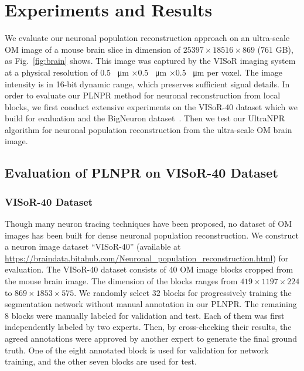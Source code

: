 \section{Experiments and Results}
\label{sec:experiments}

We evaluate our neuronal population reconstruction approach on an ultra-scale OM image of a mouse brain slice in dimension of $25397\times 18516\times 869$ ($761$ GB), as Fig.~\ref{fig:brain} shows.
%
This image was captured by the VISoR imaging system~\cite{Wang2019} at a physical resolution of $0.5$ \SI{}{\micro\metre} $\times0.5$ \SI{}{\micro\metre} $\times 0.5$ \SI{}{\micro\metre} per voxel. 
%
The image intensity is in 16-bit dynamic range, which preserves sufficient signal details.
In order to evaluate our PLNPR method for neuronal reconstruction from local blocks, we first conduct extensive experiments on the VISoR-40 dataset which we build for evaluation and the BigNeuron dataset~\cite{peng2015}. 
%
Then we test our UltraNPR algorithm for neuronal population reconstruction from the ultra-scale OM brain image.

\subsection{Evaluation of PLNPR on VISoR-40 Dataset}
\label{sec:exp_PLNPR_VISoR}

\subsubsection{VISoR-40 Dataset}
Though many neuron tracing techniques have been proposed, no dataset of OM images has been built for dense neuronal population reconstruction.
We construct a neuron image dataset ``VISoR-40'' (available at \url{https://braindata.bitahub.com/Neuronal_population_reconstruction.html}) for evaluation. 
The VISoR-40 dataset consists of 40 OM image blocks cropped from the mouse brain image. The dimension of the blocks ranges from $419 \times1197 \times 224$ to $869 \times1853 \times 575$.
%
We randomly select $32$ blocks for progressively training the segmentation network without manual annotation in our PLNPR.
%
The remaining 8 blocks were manually labeled for validation and test.  
Each of them was first independently labeled by two experts. Then, by cross-checking their results, the agreed annotations were approved by another expert to generate the final ground truth.
One of the eight annotated block is used for validation for network training, and the other seven blocks are used for test. 


